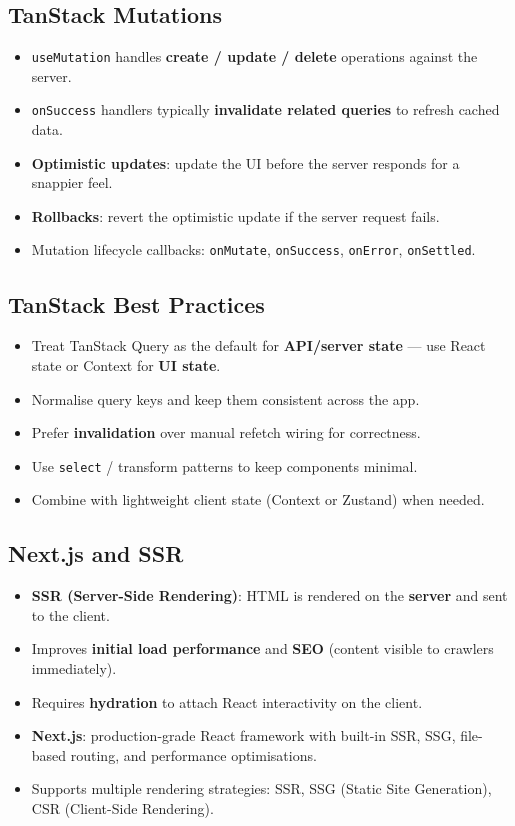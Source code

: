 \documentclass[hidelinks]{article}
\begin{document}
\subsection{TanStack Mutations}
\begin{itemize}
  \item \texttt{useMutation} handles \textbf{create / update / delete} operations against the server.
  \item \texttt{onSuccess} handlers typically \textbf{invalidate related queries} to refresh cached data.
  \item \textbf{Optimistic updates}: update the UI before the server responds for a snappier feel.
  \item \textbf{Rollbacks}: revert the optimistic update if the server request fails.
  \item Mutation lifecycle callbacks: \texttt{onMutate}, \texttt{onSuccess}, \texttt{onError}, \texttt{onSettled}.
\end{itemize}

\subsection{TanStack Best Practices}
\begin{itemize}
  \item Treat TanStack Query as the default for \textbf{API/server state} --- use React state or Context for \textbf{UI state}.
  \item Normalise query keys and keep them consistent across the app.
  \item Prefer \textbf{invalidation} over manual refetch wiring for correctness.
  \item Use \texttt{select} / transform patterns to keep components minimal.
  \item Combine with lightweight client state (Context or Zustand) when needed.
\end{itemize}

\subsection{Next.js and SSR}
\begin{itemize}
  \item \textbf{SSR (Server-Side Rendering)}: HTML is rendered on the \textbf{server} and sent to the client.
  \item Improves \textbf{initial load performance} and \textbf{SEO} (content visible to crawlers immediately).
  \item Requires \textbf{hydration} to attach React interactivity on the client.
  \item \textbf{Next.js}: production-grade React framework with built-in SSR, SSG, file-based routing, and performance optimisations.
  \item Supports multiple rendering strategies: SSR, SSG (Static Site Generation), CSR (Client-Side Rendering).
\end{itemize}
\end{document}
